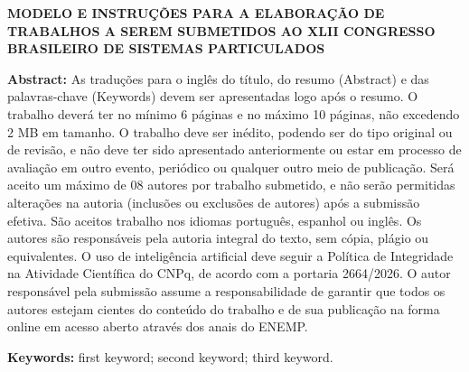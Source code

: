 \documentclass[a4paper,12pt,fleqn]{article}
\begin{document}
	\begin{center}
		{\bfseries\fontsize{14}{16} MODELO E INSTRUÇÕES PARA A ELABORAÇÃO DE TRABALHOS A SEREM SUBMETIDOS AO XLII CONGRESSO BRASILEIRO DE SISTEMAS PARTICULADOS}
	\end{center}

	\begin{justify}
		{\fontsize{12}{14}\selectfont
			\textbf{Abstract:} As traduções para o inglês do título, do resumo (Abstract) e das palavras-chave (Keywords) devem ser apresentadas logo após o resumo. O trabalho deverá ter no mínimo 6 páginas e no máximo 10 páginas, não excedendo 2 MB em tamanho. O trabalho deve ser inédito, podendo ser do tipo original ou de revisão, e não deve ter sido apresentado anteriormente ou estar em processo de avaliação em outro evento, periódico ou qualquer outro meio de publicação. Será aceito um máximo de 08 autores por trabalho submetido, e não serão permitidas alterações na autoria (inclusões ou exclusões de autores) após a submissão efetiva. São aceitos trabalho nos idiomas português, espanhol ou inglês. Os autores são responsáveis pela autoria integral do texto, sem cópia, plágio ou equivalentes. O uso de inteligência artificial deve seguir a Política de Integridade na Atividade Científica do CNPq, de acordo com a portaria 2664/2026. O autor responsável pela submissão assume a responsabilidade de garantir que todos os autores estejam cientes do conteúdo do trabalho e de sua publicação na forma online em acesso aberto através dos anais do ENEMP.

			\noindent
			\textbf{Keywords:} first keyword; second keyword; third keyword.
		}
	\end{justify}

	\thispagestyle{primeirapagina} %

	\newpage %
	

\end{document}
